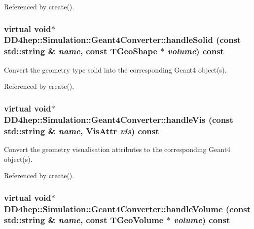 Referenced by create().\hypertarget{class_d_d4hep_1_1_simulation_1_1_geant4_converter_abde5fd683b2ac0721f3c0274af4803b8}{
\subsubsection[{handleSolid}]{\setlength{\rightskip}{0pt plus 5cm}virtual void$\ast$ DD4hep::Simulation::Geant4Converter::handleSolid (const std::string \& {\em name}, \/  const TGeoShape $\ast$ {\em volume}) const}}
\label{class_d_d4hep_1_1_simulation_1_1_geant4_converter_abde5fd683b2ac0721f3c0274af4803b8}


Convert the geometry type solid into the corresponding Geant4 object(s). 

Referenced by create().\hypertarget{class_d_d4hep_1_1_simulation_1_1_geant4_converter_ac3cb66b2af9640e210c73ef9e3411abd}{
\subsubsection[{handleVis}]{\setlength{\rightskip}{0pt plus 5cm}virtual void$\ast$ DD4hep::Simulation::Geant4Converter::handleVis (const std::string \& {\em name}, \/  {\bf VisAttr} {\em vis}) const}}
\label{class_d_d4hep_1_1_simulation_1_1_geant4_converter_ac3cb66b2af9640e210c73ef9e3411abd}


Convert the geometry visualisation attributes to the corresponding Geant4 object(s). 

Referenced by create().\hypertarget{class_d_d4hep_1_1_simulation_1_1_geant4_converter_ade3b2a14ae42910778397b07c26357db}{
\subsubsection[{handleVolume}]{\setlength{\rightskip}{0pt plus 5cm}virtual void$\ast$ DD4hep::Simulation::Geant4Converter::handleVolume (const std::string \& {\em name}, \/  const TGeoVolume $\ast$ {\em volume}) const}}
\label{class_d_d4hep_1_1_simulation_1_1_geant4_converter_ade3b2a14ae42910778397b07c26357db}


